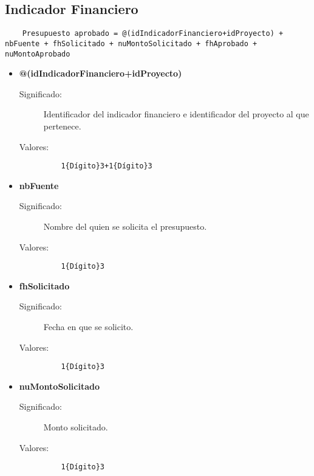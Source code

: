 \subsection{Indicador Financiero}
\label{dd:IndicadorFinanciero}
\begin{lstlisting}
    Presupuesto aprobado = @(idIndicadorFinanciero+idProyecto) + nbFuente + fhSolicitado + nuMontoSolicitado + fhAprobado + nuMontoAprobado
\end{lstlisting}
 \begin{itemize}

    \item \textbf{@(idIndicadorFinanciero+idProyecto)}
      \begin{description}
        \item [Significado:] Identificador del indicador financiero e identificador del proyecto al que pertenece.
        \item [Valores:]{\begin{lstlisting}
	1{Dígito}3+1{Dígito}3\end{lstlisting}}\end{description}

    \item \textbf{nbFuente}
      \begin{description}
        \item [Significado:] Nombre del quien se solicita el presupuesto.
        \item [Valores:]{\begin{lstlisting}
	1{Dígito}3\end{lstlisting}}\end{description}

    \item \textbf{fhSolicitado}
      \begin{description}
        \item [Significado:] Fecha en que se solicito.
        \item [Valores:]{\begin{lstlisting}
	1{Dígito}3\end{lstlisting}}\end{description}

    \item \textbf{nuMontoSolicitado}
      \begin{description}
        \item [Significado:] Monto solicitado.
        \item [Valores:]{\begin{lstlisting}
	1{Dígito}3\end{lstlisting}}\end{description}


\end{itemize}
